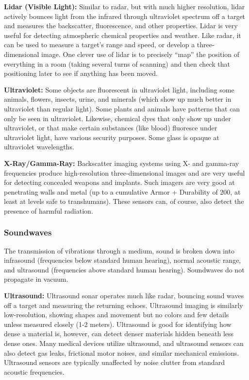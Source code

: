 \textbf{Lidar (Visible Light):} Similar to radar, but with much higher resolution, lidar actively bounces light from the infrared through ultraviolet spectrum off a target and measures the backscatter, fluorescence, and other properties. Lidar is very useful for detecting atmospheric chemical properties and weather. Like radar, it can be used to measure a target’s range and speed, or develop a three-dimensional image. One clever use of lidar is to precisely ``map'' the position of everything in a room (taking several turns of scanning) and then check that positioning later to see if anything has been moved. 

\textbf{Ultraviolet:} Some objects are fluorescent in ultraviolet light, including some animals, flowers, insects, urine, and minerals (which show up much better in ultraviolet than regular light). Some plants and animals have patterns that can only be seen in ultraviolet. Likewise, chemical dyes that only show up under ultraviolet, or that make certain substances (like blood) fluoresce under ultraviolet light, have various security purposes. Some glass is opaque at ultraviolet wavelengths. 

\textbf{X-Ray/Gamma-Ray:} Backscatter imaging systems using X- and gamma-ray frequencies produce high-resolution three-dimensional images and are very useful for detecting concealed weapons and implants. Such imagers are very good at penetrating walls and metal (up to a cumulative Armor + Durability of 200, at least at levels safe to transhumans). These sensors can, of course, also detect the presence of harmful radiation. 

\subsubsection{Soundwaves} 

The transmission of vibrations through a medium, sound is broken down into infrasound (frequencies below standard human hearing), normal acoustic range, and ultrasound (frequencies above standard human hearing). Soundwaves do not propagate in vacuum. 

\textbf{Ultrasound:} Ultrasound sonar operates much like radar, bouncing sound waves off a target and measuring the returning echoes. Ultrasound imaging is similarly low-resolution, showing shapes and movement but no colors and few details unless measured closely (1-2 meters). Ultrasound is good for identifying how dense a material is, however, can detect denser materials hidden beneath less dense ones. Many medical devices utilize ultrasound, and ultrasound sensors can also detect gas leaks, frictional motor noises, and similar mechanical emissions. Ultrasound sensors are typically unaffected by noise clutter from standard acoustic frequencies. 

